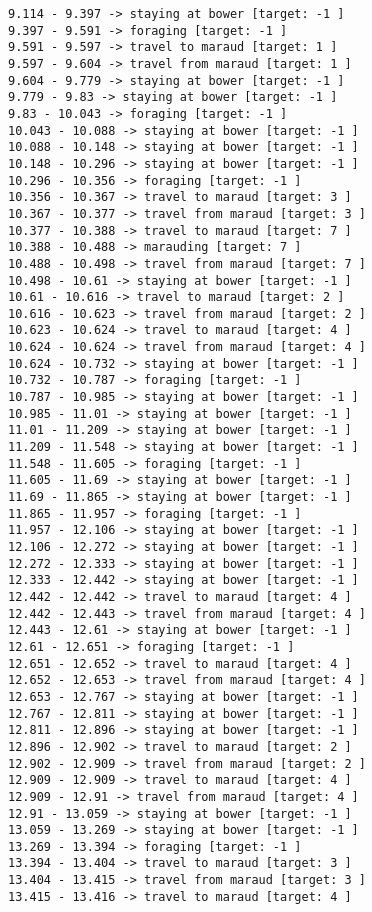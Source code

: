 \documentclass[11pt]{article}
\begin{document}
\begin{Verbatim}[commandchars=\\\{\}]
9.114 - 9.397 -> staying at bower [target: -1 ]
9.397 - 9.591 -> foraging [target: -1 ]
9.591 - 9.597 -> travel to maraud [target: 1 ]
9.597 - 9.604 -> travel from maraud [target: 1 ]
9.604 - 9.779 -> staying at bower [target: -1 ]
9.779 - 9.83 -> staying at bower [target: -1 ]
9.83 - 10.043 -> foraging [target: -1 ]
10.043 - 10.088 -> staying at bower [target: -1 ]
10.088 - 10.148 -> staying at bower [target: -1 ]
10.148 - 10.296 -> staying at bower [target: -1 ]
10.296 - 10.356 -> foraging [target: -1 ]
10.356 - 10.367 -> travel to maraud [target: 3 ]
10.367 - 10.377 -> travel from maraud [target: 3 ]
10.377 - 10.388 -> travel to maraud [target: 7 ]
10.388 - 10.488 -> marauding [target: 7 ]
10.488 - 10.498 -> travel from maraud [target: 7 ]
10.498 - 10.61 -> staying at bower [target: -1 ]
10.61 - 10.616 -> travel to maraud [target: 2 ]
10.616 - 10.623 -> travel from maraud [target: 2 ]
10.623 - 10.624 -> travel to maraud [target: 4 ]
10.624 - 10.624 -> travel from maraud [target: 4 ]
10.624 - 10.732 -> staying at bower [target: -1 ]
10.732 - 10.787 -> foraging [target: -1 ]
10.787 - 10.985 -> staying at bower [target: -1 ]
10.985 - 11.01 -> staying at bower [target: -1 ]
11.01 - 11.209 -> staying at bower [target: -1 ]
11.209 - 11.548 -> staying at bower [target: -1 ]
11.548 - 11.605 -> foraging [target: -1 ]
11.605 - 11.69 -> staying at bower [target: -1 ]
11.69 - 11.865 -> staying at bower [target: -1 ]
11.865 - 11.957 -> foraging [target: -1 ]
11.957 - 12.106 -> staying at bower [target: -1 ]
12.106 - 12.272 -> staying at bower [target: -1 ]
12.272 - 12.333 -> staying at bower [target: -1 ]
12.333 - 12.442 -> staying at bower [target: -1 ]
12.442 - 12.442 -> travel to maraud [target: 4 ]
12.442 - 12.443 -> travel from maraud [target: 4 ]
12.443 - 12.61 -> staying at bower [target: -1 ]
12.61 - 12.651 -> foraging [target: -1 ]
12.651 - 12.652 -> travel to maraud [target: 4 ]
12.652 - 12.653 -> travel from maraud [target: 4 ]
12.653 - 12.767 -> staying at bower [target: -1 ]
12.767 - 12.811 -> staying at bower [target: -1 ]
12.811 - 12.896 -> staying at bower [target: -1 ]
12.896 - 12.902 -> travel to maraud [target: 2 ]
12.902 - 12.909 -> travel from maraud [target: 2 ]
12.909 - 12.909 -> travel to maraud [target: 4 ]
12.909 - 12.91 -> travel from maraud [target: 4 ]
12.91 - 13.059 -> staying at bower [target: -1 ]
13.059 - 13.269 -> staying at bower [target: -1 ]
13.269 - 13.394 -> foraging [target: -1 ]
13.394 - 13.404 -> travel to maraud [target: 3 ]
13.404 - 13.415 -> travel from maraud [target: 3 ]
13.415 - 13.416 -> travel to maraud [target: 4 ]

\end{Verbatim}
\end{document}
